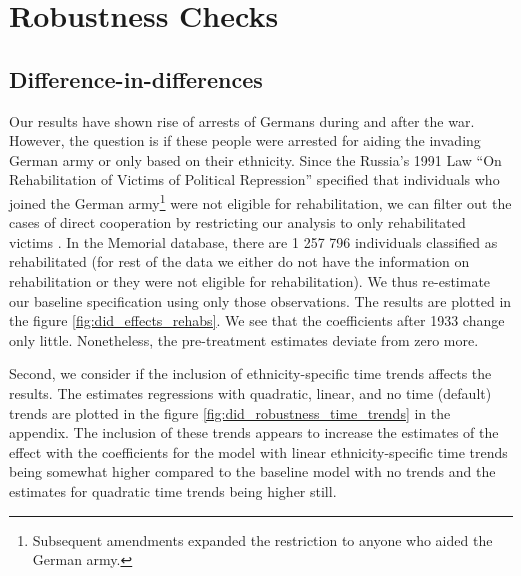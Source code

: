 

\section{Robustness Checks} \label{subsec:robust_checks}
\subsection{Difference-in-differences}

Our results have shown rise of arrests of Germans during and after the war. 
However, the question is if these people were arrested for aiding the invading German army or only based on their ethnicity. 
Since the  Russia’s 1991 Law  \enquote{On Rehabilitation of Victims of Political Repression} specified  that individuals who joined the German army\footnote{Subsequent amendments expanded the restriction to anyone who aided the German army. }  were not eligible for rehabilitation, we can filter out the cases of direct 
cooperation by restricting  our analysis to only rehabilitated victims \citep{frierson_russias_2014}. 
In the Memorial database, there  are 1 257 796 individuals  classified as  rehabilitated (for rest of the data we either do not have the information on rehabilitation or they were not eligible for rehabilitation).  We thus re-estimate our baseline specification using only those observations. The results are plotted in the figure \ref{fig:did_effects_rehabs}. We see that the coefficients after 1933 change only little. Nonetheless, the pre-treatment estimates deviate from zero more. 

Second, we consider if the inclusion of ethnicity-specific time trends affects the results.
The estimates regressions with quadratic, linear, and no time (default) trends are  plotted in the figure \ref{fig:did_robustness_time_trends} in the appendix. 
The inclusion of these trends appears to increase the estimates of the effect  with  the coefficients for the model with linear ethnicity-specific time trends being somewhat higher compared to the baseline model with no trends and the estimates for quadratic time trends being higher still.

